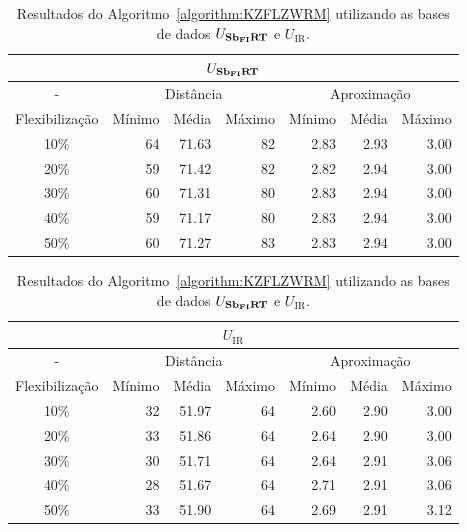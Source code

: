\begin{table}[!htb]
  \caption{Resultados do Algoritmo~\ref{algorithm:KZFLZWRM} utilizando as bases de dados $U_{\textbf{Sb\textsubscript{FI}RT}}{}$ e $U_{\text{IR}}$.}
  \label{table:DRUHLZFM}
  \centering
  \begin{tabular}{|c|r|r|r|r|r|r|}
    \hline
    \multicolumn{7}{|c|}{$U_{\textbf{Sb\textsubscript{FI}RT}}{}$}                                                                      \\ \hline
      -            & \multicolumn{3}{c|}{Distância}             & \multicolumn{3}{c|}{Aproximação}           \\ \hline
    Flexibilização & Mínimo       & Média        & Máximo       & Mínimo       & Média        & Máximo       \\ \hline  
    10\%           & 64           & 71.63        & 82           & 2.83         & 2.93         & 3.00         \\ \hline
    20\%           & 59           & 71.42        & 82           & 2.82         & 2.94         & 3.00         \\ \hline
    30\%           & 60           & 71.31        & 80           & 2.83         & 2.94         & 3.00         \\ \hline
    40\%           & 59           & 71.17        & 80           & 2.83         & 2.94         & 3.00         \\ \hline
    50\%           & 60           & 71.27        & 83           & 2.83         & 2.94         & 3.00         \\ \hline    
  \end{tabular}

  \vspace{5mm}

  \begin{tabular}{|c|r|r|r|r|r|r|}
    \hline
    \multicolumn{7}{|c|}{$U_{\text{IR}}$}                                                                    \\ \hline
      -            & \multicolumn{3}{c|}{Distância}             & \multicolumn{3}{c|}{Aproximação}           \\ \hline
    Flexibilização & Mínimo       & Média        & Máximo       & Mínimo       & Média        & Máximo       \\ \hline  
    10\%           & 32           & 51.97        & 64           & 2.60         & 2.90         & 3.00         \\ \hline
    20\%           & 33           & 51.86        & 64           & 2.64         & 2.90         & 3.00         \\ \hline
    30\%           & 30           & 51.71        & 64           & 2.64         & 2.91         & 3.06         \\ \hline
    40\%           & 28           & 51.67        & 64           & 2.71         & 2.91         & 3.06         \\ \hline
    50\%           & 33           & 51.90        & 64           & 2.69         & 2.91         & 3.12         \\ \hline    
  \end{tabular}
\end{table}


